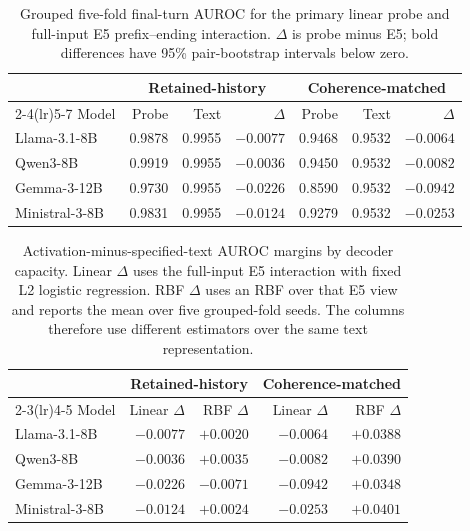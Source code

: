 \documentclass{article}
\begin{document}
\begin{table}[h]
  \caption{Grouped five-fold final-turn AUROC for the primary linear probe and
  full-input E5 prefix--ending interaction. $\Delta$ is probe minus E5; bold
  differences have 95\% pair-bootstrap intervals below zero.}
  \label{tab:appendix-crossmodel}
  \centering
  \small
  \begin{tabular}{lrrr@{\qquad}rrr}
    \toprule
      & \multicolumn{3}{c}{Retained-history} & \multicolumn{3}{c}{Coherence-matched} \\
    \cmidrule(lr){2-4}\cmidrule(lr){5-7}
    Model & Probe & Text & $\Delta$ & Probe & Text & $\Delta$ \\
    \midrule
    Llama-3.1-8B & 0.9878 & 0.9955 & $\mathbf{-0.0077}$ & 0.9468 & 0.9532 & $-0.0064$ \\
    Qwen3-8B & 0.9919 & 0.9955 & $-0.0036$ & 0.9450 & 0.9532 & $-0.0082$ \\
    Gemma-3-12B & 0.9730 & 0.9955 & $\mathbf{-0.0226}$ & 0.8590 & 0.9532 & $\mathbf{-0.0942}$ \\
    Ministral-3-8B & 0.9831 & 0.9955 & $\mathbf{-0.0124}$ & 0.9279 & 0.9532 & $\mathbf{-0.0253}$ \\
    \bottomrule
  \end{tabular}
\end{table}

\begin{table}[h]
  \caption{Activation-minus-specified-text AUROC margins by decoder capacity.
  Linear $\Delta$ uses the full-input E5 interaction with fixed L2 logistic
  regression. RBF $\Delta$ uses an RBF over that E5 view and reports the mean
  over five grouped-fold seeds. The columns therefore use different estimators
  over the same text representation.}
  \label{tab:appendix-nonlinear-margins}
  \centering
  \small
  \setlength{\tabcolsep}{7pt}
  \begin{tabular}{lrr@{\qquad}rr}
    \toprule
      & \multicolumn{2}{c}{Retained-history} &
        \multicolumn{2}{c}{Coherence-matched} \\
    \cmidrule(lr){2-3}\cmidrule(lr){4-5}
    Model & Linear $\Delta$ & RBF $\Delta$ & Linear $\Delta$ & RBF $\Delta$ \\
    \midrule
    Llama-3.1-8B & $-0.0077$ & $+0.0020$ & $-0.0064$ & $+0.0388$ \\
    Qwen3-8B & $-0.0036$ & $+0.0035$ & $-0.0082$ & $+0.0390$ \\
    Gemma-3-12B & $-0.0226$ & $-0.0071$ & $-0.0942$ & $+0.0348$ \\
    Ministral-3-8B & $-0.0124$ & $+0.0024$ & $-0.0253$ & $+0.0401$ \\
    \bottomrule
  \end{tabular}
\end{table}
\end{document}
